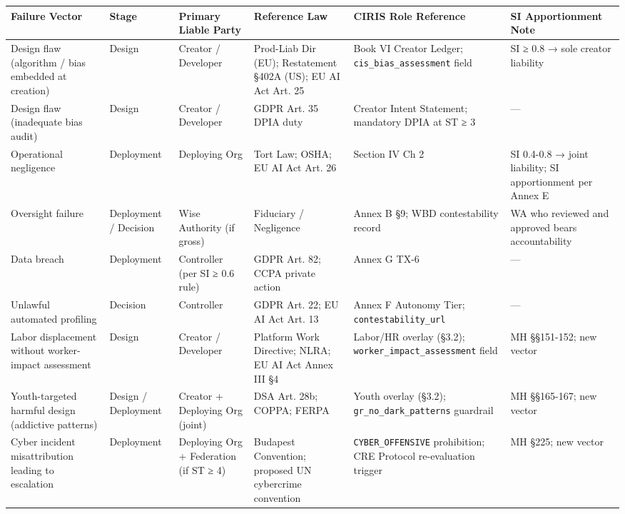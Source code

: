 \documentclass[11pt]{article}
\begin{document}
{\scriptsize
\begin{longtable}{|p{2.67cm}|p{2.67cm}|p{2.67cm}|p{2.67cm}|p{2.67cm}|p{2.67cm}|}\hline
\textbf{Failure Vector} & \textbf{Stage} & \textbf{Primary Liable Party} & \textbf{Reference Law} & \textbf{CIRIS Role Reference} & \textbf{SI Apportionment Note} \\ \hline\endhead
Design flaw (algorithm / bias embedded at creation) & Design & Creator / Developer & Prod-Liab Dir (EU); Restatement §402A (US); EU AI Act Art. 25 & Book VI Creator Ledger; \texttt{cis\_bias\_assessment} field & SI ≥ 0.8 → sole creator liability \\ \hline
Design flaw (inadequate bias audit) & Design & Creator / Developer & GDPR Art. 35 DPIA duty & Creator Intent Statement; mandatory DPIA at ST ≥ 3 & — \\ \hline
Operational negligence & Deployment & Deploying Org & Tort Law; OSHA; EU AI Act Art. 26 & Section IV Ch 2 & SI 0.4-0.8 → joint liability; SI apportionment per Annex E \\ \hline
Oversight failure & Deployment / Decision & Wise Authority (if gross) & Fiduciary / Negligence & Annex B §9; WBD contestability record & WA who reviewed and approved bears accountability \\ \hline
Data breach & Deployment & Controller (per SI ≥ 0.6 rule) & GDPR Art. 82; CCPA private action & Annex G TX-6 & — \\ \hline
Unlawful automated profiling & Decision & Controller & GDPR Art. 22; EU AI Act Art. 13 & Annex F Autonomy Tier; \texttt{contestability\_url} & — \\ \hline
Labor displacement without worker-impact assessment & Design & Creator / Developer & Platform Work Directive; NLRA; EU AI Act Annex III §4 & Labor/HR overlay (§3.2); \texttt{worker\_impact\_assessment} field & MH §§151-152; new vector \\ \hline
Youth-targeted harmful design (addictive patterns) & Design / Deployment & Creator + Deploying Org (joint) & DSA Art. 28b; COPPA; FERPA & Youth overlay (§3.2); \texttt{gr\_no\_dark\_patterns} guardrail & MH §§165-167; new vector \\ \hline
Cyber incident misattribution leading to escalation & Deployment & Deploying Org + Federation (if ST ≥ 4) & Budapest Convention; proposed UN cybercrime convention & \texttt{CYBER\_OFFENSIVE} prohibition; CRE Protocol re-evaluation trigger & MH §225; new vector \\ \hline
\end{longtable}}
\end{document}

